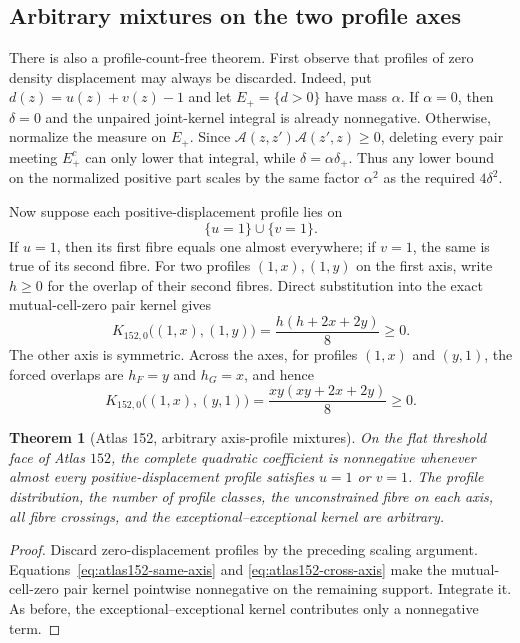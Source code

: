 \documentclass[11pt]{article}
\newtheorem{theorem}{Theorem}[section]
\begin{document}
\subsection{Arbitrary mixtures on the two profile axes}

There is also a profile-count-free theorem.  First observe that profiles of
zero density displacement may always be discarded.  Indeed, put
$d(z)=u(z)+v(z)-1$ and let $E_+=\{d>0\}$ have mass $\alpha$.  If
$\alpha=0$, then $\delta=0$ and the unpaired joint-kernel integral is already
nonnegative.  Otherwise, normalize the measure on $E_+$.  Since
$\mathcal A(z,z')\mathcal A(z',z)\geq0$, deleting every pair meeting
$E_+^c$ can only lower that integral, while
$\delta=\alpha\delta_+$.  Thus any lower bound on the normalized positive
part scales by the same factor $\alpha^2$ as the required $4\delta^2$.

Now suppose each positive-displacement profile lies on
\[
 \{u=1\}\cup\{v=1\}.
\]
If $u=1$, then its first fibre equals one almost everywhere; if $v=1$, the
same is true of its second fibre.  For two profiles $(1,x),(1,y)$ on the
first axis, write $h\geq0$ for the overlap of their second fibres.  Direct
substitution into the exact mutual-cell-zero pair kernel gives
\begin{equation}
 K_{152,0}\bigl((1,x),(1,y)\bigr)
 =\frac{h(h+2x+2y)}8\geq0.
 \label{eq:atlas152-same-axis}
\end{equation}
The other axis is symmetric.  Across the axes, for profiles $(1,x)$ and
$(y,1)$, the forced overlaps are $h_F=y$ and $h_G=x$, and hence
\begin{equation}
 K_{152,0}\bigl((1,x),(y,1)\bigr)
 =\frac{xy(xy+2x+2y)}8\geq0.
 \label{eq:atlas152-cross-axis}
\end{equation}

\begin{theorem}[Atlas 152, arbitrary axis-profile mixtures]
\label{thm:atlas152-axis}
On the flat threshold face of Atlas $152$, the complete quadratic
coefficient is nonnegative whenever almost every positive-displacement
profile satisfies $u=1$ or $v=1$.  The profile distribution, the number of
profile classes, the unconstrained fibre on each axis, all fibre crossings,
and the exceptional--exceptional kernel are arbitrary.
\end{theorem}

\begin{proof}
Discard zero-displacement profiles by the preceding scaling argument.
Equations~\eqref{eq:atlas152-same-axis} and
\eqref{eq:atlas152-cross-axis} make the mutual-cell-zero pair kernel
pointwise nonnegative on the remaining support.  Integrate it.  As before,
the exceptional--exceptional kernel contributes only a nonnegative term.
\end{proof}
\end{document}

